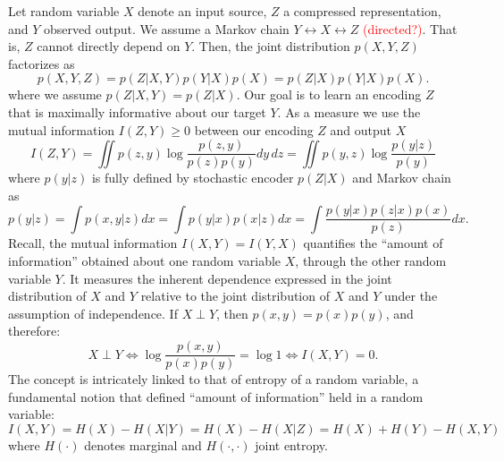 \documentclass[11pt]{article}
\newcommand\myworries[1]{\textcolor{red}{(#1)}}
\begin{document}
Let random variable $X$ denote an input source, $Z$ a compressed representation, and $Y$ observed output. We assume a Markov chain $Y \leftrightarrow X \leftrightarrow Z$ \myworries{directed?}. That is, $Z$ cannot directly depend on $Y$. Then, the joint distribution $p(X,Y,Z)$ factorizes as
\begin{equation}
p(X, Y, Z) = p(Z\vert X,Y)p(Y\vert X)p(X) = p(Z\vert X)p(Y\vert X)p(X).
\end{equation}
where we assume $p(Z\vert X,Y) = p(Z\vert X)$.
Our goal is to learn an encoding $Z$ that is maximally informative about our target $Y$. As a measure we use the mutual information $I(Z,Y) \geq 0$ between our encoding $Z$ and output $X$
\begin{equation}
I(Z,Y) = \iint p(z,y) \log \frac{p(z,y)}{p(z)p(y)} dy\, dz = \iint p(y,z) \log \frac{p(y\vert z)}{p(y)}
\label{eq:I_Z_Y}
\end{equation}
where  $p(y\vert z)$ is fully defined by stochastic encoder $p(Z\vert X)$ and Markov chain as
\begin{equation}
p(y\vert z) = \int p(x,y\vert z) dx = \int p(y \vert x) p(x \vert z) dx = \int \frac{p(y \vert x)p(z \vert x) p(x)}{p(z)}dx.
\label{eq:p_y_z}
\end{equation}
Recall, the mutual information $I(X,Y) = I(Y,X)$ quantifies the ``amount of information'' obtained about one random variable $X$, through the other random variable $Y$. It measures the inherent dependence expressed in the joint distribution of $X$ and $Y$ relative to the joint distribution of $X$ and $Y$ under the assumption of independence. If $X \perp Y$, then $p(x,y) = p(x)p(y)$, and therefore:
\begin{equation}
X \perp Y \Leftrightarrow \log\frac{p(x,y)}{p(x)p(y)} = \log 1 \Leftrightarrow I(X,Y) = 0.
\end{equation}
The concept is intricately linked to that of entropy of a random variable, a fundamental notion that defined ``amount of information'' held in a random variable:
\begin{equation}
I(X,Y) = H(X) - H(X \vert Y) = H(X) - H(X \vert Z) = H(X) + H(Y) - H(X,Y)
\end{equation}
where $H(\cdot)$ denotes marginal and $H(\cdot,\cdot)$ joint entropy.
\end{document}
